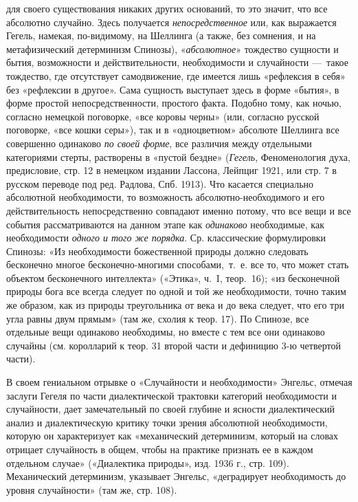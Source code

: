\begin{enumerate}
для своего существования никаких других оснований, то это значит, что все
абсолютно случайно. Здесь получается {\em непосредственное} или, как
выражается Гегель, намекая, по-видимому, на Шеллинга (а также, без сомнения,
и на метафизический детерминизм Спинозы), «{\em абсолютное}» тождество
сущности и бытия, возможности и действительности, необходимости и
случайности —~такое тождество, где отсутствует самодвижение, где имеется
лишь «рефлексия в себя» без «рефлексии в другое». Сама сущность выступает
здесь в форме «бытия», в форме простой непосредственности, простого факта.
Подобно тому, как ночью, согласно немецкой поговорке, «все коровы черны»
(или, согласно русской поговорке, «все кошки серы»), так и в «одноцветном»
абсолюте Шеллинга все совершенно одинаково {\em по своей форме}, все
различия между отдельными категориями стерты, растворены в «пустой бездне»
({\em Гегель}, Феноменология духа, предисловие, стр. 12 в немецком
издании Лассона, Лейпциг 1921, или стр. 7 в русском переводе под ред.
Радлова, Спб. 1913). Что касается специально абсолютной необходимости, то
возможность абсолютно-необходимого и его действительность непосредственно
совпадают именно потому, что все вещи и все события рассматриваются на
данном этапе как {\em одинаково} необходимые, как необходимости
{\em одного и того же порядка}. Ср. классические формулировки Спинозы:
«Из необходимости божественной природы должно следовать бесконечно многое
бесконечно-многими способами,~т.~е. все то, что может стать объектом
бесконечного интеллекта» («Этика», ч.~I, теор.~16); «из бесконечной природы
бога все всегда следует по одной и той же необходимости, точно таким же
образом, как из природы треугольника от века и до века следует, что его три
угла равны двум прямым» (там же, схолия к теор. 17). По Спинозе, все
отдельные вещи одинаково необходимы, но вместе с тем все они одинаково
случайны (см. королларий к теор. 31 второй части и дефиницию 3-ю четвертой
части).
\end{enumerate}
В своем гениальном отрывке о «Случайности и необходимости» Энгельс, отмечая
заслуги Гегеля по части диалектической трактовки категорий необходимости и
случайности, дает замечательный по своей глубине и ясности диалектический
анализ и диалектическую критику точки зрения абсолютной необходимости,
которую он характеризует как «механический детерминизм, который на словах
отрицает случайность в общем, чтобы на практике признать ее в каждом
отдельном случае» («Диалектика природы», изд. 1936 г., стр. 109).
Механический детерминизм, указывает Энгельс, «деградирует необходимость до
уровня случайности» (там же, стр. 108).

